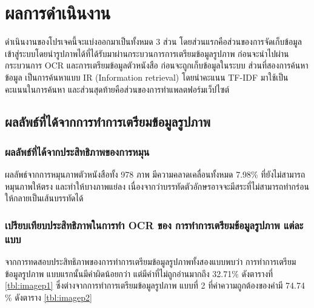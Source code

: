 \chapter{ผลการดำเนินงาน}

ดำเนินงานของโปรเจคนี้จะแบ่งออกมาเป็นทั้งหมด 3 ส่วน โดยส่วนแรกคือส่วนของการจัดเก็บข้อมูลเข้าสู่ระบบโดยนำรูปภาพได้ที่ได้รับมาผ่านกระบวนการการเตรียมข้อมูลรูปภาพ ก่อนจะนำไปผ่านกระบวนการ OCR และการเตรียมข้อมูลตัวหนังสือ ก่อนจะถูกเก็บข้อมูลในระบบ ส่วนที่สองการค้นหาข้อมูล เป็นการค้นหาแบบ IR (Information retrieval) โดยนำคะแนน TF-IDF มาใช้เป็นคะแนนในการค้นหา และส่วนสุดท้ายคือส่วนของการทำแพลตฟอร์มเว็ปไซต์

\section{ผลลัพธ์ที่ได้จากการทำการเตรียมข้อมูลรูปภาพ}

\subsection{ผลลัพธ์ที่ได้จากประสิทธิภาพของการหมุน}
ผลลัพธ์จากการหมุนภาพตัวหนังสือทั้ง 978 ภาพ มีความคลาดเคลื่อนทั้งหมด 7.98\% ที่ยังไม่สามารถหมุนภาพให้ตรง และทำให้บางภาพแย่ลง เนื่องจากว่าบรรทัดตัวอักษรอาจจะมีสระที่ไม่สามารถทำกร่อนให้กลายเป็นเส้นบรรทัดได้

\subsection{เปรียบเทียบประสิทธิภาพในการทำ OCR ของ การทำการเตรียมข้อมูลรูปภาพ แต่ละแบบ}

จากการทดสอบประสิทธิภาพของการทำการเตรียมข้อมูลรูปภาพทั้งสองแบบพบว่า การทำการเตรียมข้อมูลรูปภาพ แบบแรกนั้นมีคำผิดน้อยกว่า แต่มีคำที่ไม่ถูกอ่านมากถึง 32.71\% ดังตารางที่ \ref{tbl:imagep1} ซึ่งต่างจากการทำการเตรียมข้อมูลรูปภาพ แบบที่ 2 ที่ค่าความถูกต้องของคำมี 74.74 \% ดังตาราง \ref{tbl:imagep2}

